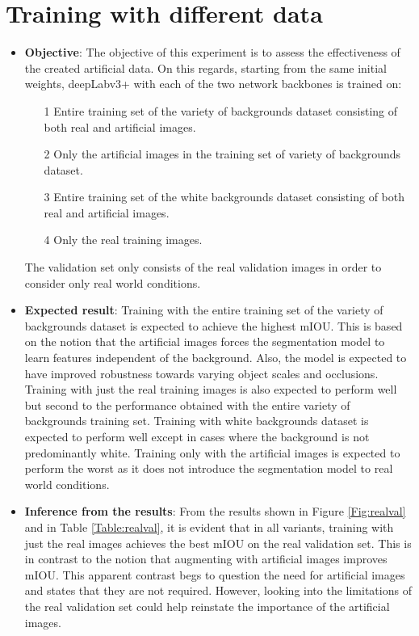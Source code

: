 \section{Training with different data}

	\begin{itemize}
		\item \textbf{Objective}: The objective of this experiment is to assess the effectiveness of the created artificial data. On this regards, starting from the same initial weights, deepLabv3+ with each of the two network backbones is trained on:
		\begin{itemize}
			\item[1] Entire training set of the variety of backgrounds dataset consisting of both real and artificial images.
			\item[2] Only the artificial images in the training set of variety of backgrounds dataset.
			\item[3] Entire training set of the white backgrounds dataset consisting of both real and artificial images.
			\item[4] Only the real training images.
		\end{itemize}
	The validation set only consists of the real validation images in order to consider only real world conditions.
		\item \textbf{Expected result}: Training with the entire training set of the variety of backgrounds dataset is expected to achieve the highest mIOU. This is based on the notion that the artificial images forces the segmentation model to learn features independent of the background. Also, the model is expected to have improved robustness towards varying object scales and occlusions. Training with just the real training images is also expected to perform well but second to the performance obtained with the entire variety of backgrounds training set. Training with white backgrounds dataset is expected to perform well except in cases where the background is not predominantly white. Training only with the artificial images is expected to perform the worst as it does not introduce the segmentation model to real world conditions.
		\item \textbf{Inference from the results}: From the results shown in Figure \ref{Fig:realval} and in Table \ref{Table:realval}, it is evident that in all variants, training with just the real images achieves the best mIOU on the real validation set. This is in contrast to the notion that augmenting with artificial images improves mIOU. This apparent contrast begs to question the need for artificial images and states that they are not required. However, looking into the limitations of the real validation set could help reinstate the importance of the artificial images.

\end{itemize}
